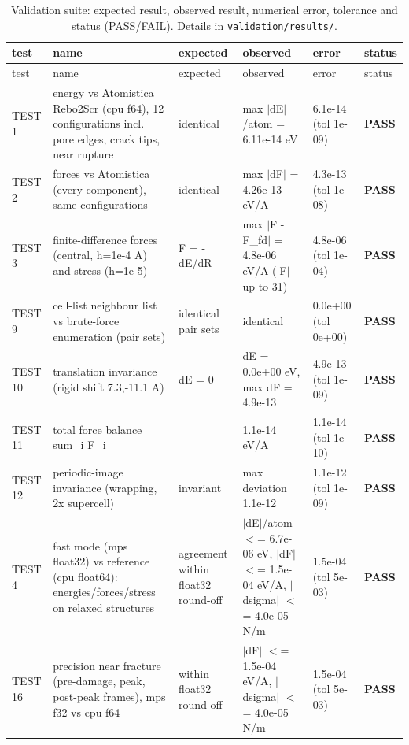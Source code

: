 \begingroup\footnotesize\setlength{\tabcolsep}{4pt}
\begin{longtable}{>{\raggedright\arraybackslash}p{1.1cm}>{\raggedright\arraybackslash}p{4.4cm}>{\raggedright\arraybackslash}p{2.7cm}>{\raggedright\arraybackslash}p{4.1cm}>{\raggedright\arraybackslash}p{1.2cm}p{0.9cm}}
\caption{Validation suite: expected result, observed result, numerical error, tolerance and status (PASS/FAIL). Details in \texttt{validation/results/}.}\label{tab:validation}\\
\toprule test & name & expected & observed & error & status\\ \midrule\endfirsthead
\toprule test & name & expected & observed & error & status\\ \midrule\endhead
TEST 1 & energy vs Atomistica Rebo2Scr (cpu f64), 12 configurations incl. pore edges, crack tips, near rupture & identical & max $|$dE$|$/atom = 6.11e-14 eV & 6.1e-14 (tol 1e-09) & \textbf{PASS}\\
TEST 2 & forces vs Atomistica (every component), same configurations & identical & max $|$dF$|$ = 4.26e-13 eV/A & 4.3e-13 (tol 1e-08) & \textbf{PASS}\\
TEST 3 & finite-difference forces (central, h=1e-4 A) and stress (h=1e-5) & F = -dE/dR & max $|$F - F\_fd$|$ = 4.8e-06 eV/A ($|$F$|$ up to 31) & 4.8e-06 (tol 1e-04) & \textbf{PASS}\\
TEST 9 & cell-list neighbour list vs brute-force enumeration (pair sets) & identical pair sets & identical & 0.0e+00 (tol 0e+00) & \textbf{PASS}\\
TEST 10 & translation invariance (rigid shift 7.3,-11.1 A) & dE = 0 & dE = 0.0e+00 eV, max dF = 4.9e-13 & 4.9e-13 (tol 1e-09) & \textbf{PASS}\\
TEST 11 & total force balance sum\_i F\_i & 0 & 1.1e-14 eV/A & 1.1e-14 (tol 1e-10) & \textbf{PASS}\\
TEST 12 & periodic-image invariance (wrapping, 2x supercell) & invariant & max deviation 1.1e-12 & 1.1e-12 (tol 1e-09) & \textbf{PASS}\\
TEST 4 & fast mode (mps float32) vs reference (cpu float64): energies/forces/stress on relaxed structures & agreement within float32 round-off & $|$dE$|$/atom $<$= 6.7e-06 eV, $|$dF$|$ $<$= 1.5e-04 eV/A, $|$dsigma$|$ $<$= 4.0e-05 N/m & 1.5e-04 (tol 5e-03) & \textbf{PASS}\\
TEST 16 & precision near fracture (pre-damage, peak, post-peak frames), mps f32 vs cpu f64 & within float32 round-off & $|$dF$|$ $<$= 1.5e-04 eV/A, $|$dsigma$|$ $<$= 4.0e-05 N/m & 1.5e-04 (tol 5e-03) & \textbf{PASS}\\

\end{longtable}
